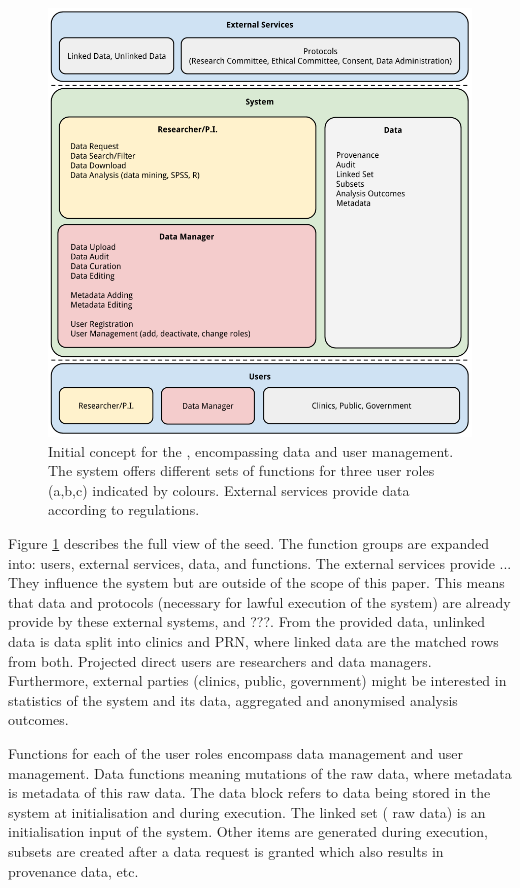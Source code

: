 \begin{figure}[t]
	\centering
	\includegraphics[width=1.0\linewidth]{images/brainstorm-before}
	\caption{
		Initial concept for the \ivfsystem{}, encompassing data and user management. 
		The system offers different sets of functions for three user roles (a,b,c) indicated by colours. 
		External services provide data according to regulations.
	}
	\label{fig:brainstorm-before}
\end{figure}

Figure \ref{fig:brainstorm-before} describes the full view of the seed. The function groups are expanded into: users, external services, data, and functions.
The external services provide ...
They influence the system but are outside of the scope of this paper.
This means that data and protocols (necessary for lawful execution of the system) 
are already provide by these external systems, and ???.
From the provided data, unlinked data is \project{} data split into clinics and PRN, where linked data are the matched rows from both.
Projected direct users are researchers and data managers.
Furthermore, external parties (clinics, public, government) might be interested in statistics of the system and its data, \eg{} aggregated and anonymised analysis outcomes.

Functions for each of the user roles encompass data management and user management.
Data functions meaning mutations of the raw \project{} data, where metadata is metadata of this raw data. 
The data block refers to data being stored in the system at initialisation and during execution.
The linked set (\ie{} raw data) is an initialisation input of the system.
Other items are generated during execution, \eg{} subsets are created after a data request is granted which also results in provenance data, etc.